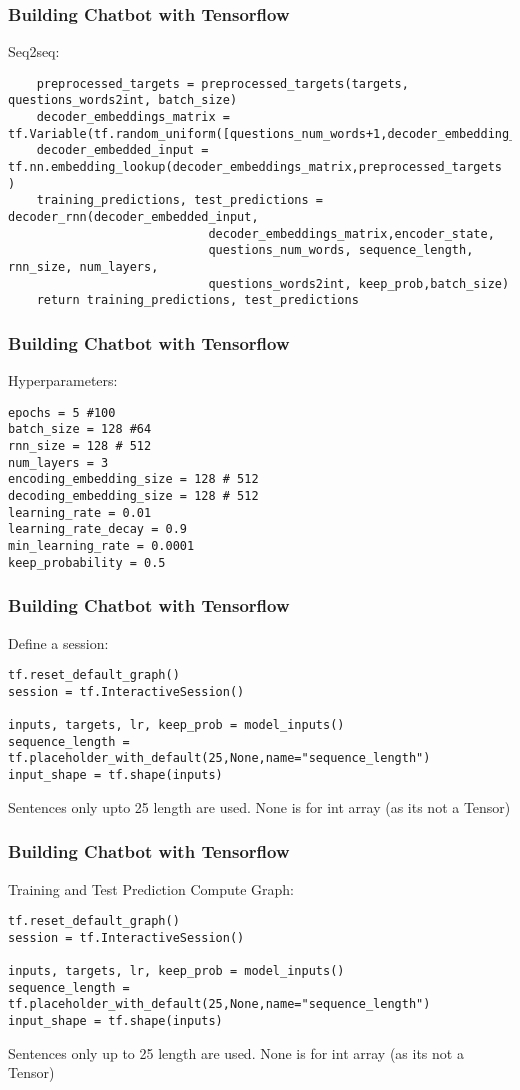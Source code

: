 \begin{frame}[fragile]\frametitle{Building Chatbot with Tensorflow}
Seq2seq:
\begin{lstlisting}
    preprocessed_targets = preprocessed_targets(targets, questions_words2int, batch_size)
    decoder_embeddings_matrix = tf.Variable(tf.random_uniform([questions_num_words+1,decoder_embedding_size],0,1))
    decoder_embedded_input = tf.nn.embedding_lookup(decoder_embeddings_matrix,preprocessed_targets )
    training_predictions, test_predictions = decoder_rnn(decoder_embedded_input,
                            decoder_embeddings_matrix,encoder_state,
                            questions_num_words, sequence_length, rnn_size, num_layers, 
                            questions_words2int, keep_prob,batch_size)
    return training_predictions, test_predictions             
\end{lstlisting}

\end{frame}

\begin{frame}[fragile]\frametitle{Building Chatbot with Tensorflow}
Hyperparameters:
\begin{lstlisting}
epochs = 5 #100
batch_size = 128 #64
rnn_size = 128 # 512
num_layers = 3
encoding_embedding_size = 128 # 512
decoding_embedding_size = 128 # 512
learning_rate = 0.01
learning_rate_decay = 0.9
min_learning_rate = 0.0001
keep_probability = 0.5         
\end{lstlisting}

\end{frame}

\begin{frame}[fragile]\frametitle{Building Chatbot with Tensorflow}
Define a session:
\begin{lstlisting}
tf.reset_default_graph()
session = tf.InteractiveSession()

inputs, targets, lr, keep_prob = model_inputs()
sequence_length = tf.placeholder_with_default(25,None,name="sequence_length")
input_shape = tf.shape(inputs)
\end{lstlisting}
Sentences only upto 25 length are used. None is for int array (as its not a Tensor)
\end{frame}


\begin{frame}[fragile]\frametitle{Building Chatbot with Tensorflow}
Training and Test Prediction Compute Graph:
\begin{lstlisting}
tf.reset_default_graph()
session = tf.InteractiveSession()

inputs, targets, lr, keep_prob = model_inputs()
sequence_length = tf.placeholder_with_default(25,None,name="sequence_length")
input_shape = tf.shape(inputs)
\end{lstlisting}
Sentences only up to 25 length are used. None is for int array (as its not a Tensor)
\end{frame}

